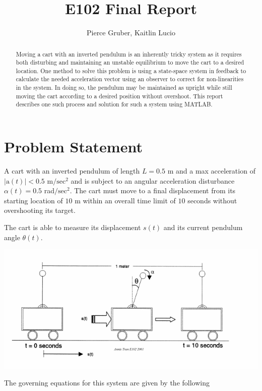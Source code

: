 \documentclass[10pt]{article}
\title{E102 Final Report}
\author{Pierce Gruber, Kaitlin Lucio}
\begin{document}
\maketitle

\begin{abstract}
Moving a cart with an inverted pendulum is an inherently tricky system as it requires both disturbing and maintaining an unstable equilibrium to move the cart to a desired location. One method to solve this problem is using a state-space system in feedback to calculate the needed acceleration vector using an observer to correct for non-linearities in the system. In doing so, the pendulum may be maintained as upright while still moving the cart according to a desired position without overshoot. This report describes one such process and solution for such a system using MATLAB.
\end{abstract}

\section{Problem Statement}
A cart with an inverted pendulum of length $L = 0.5\text{ m}$ and a max acceleration of $|\text{a}(t)| < 0.5 \text{ m}/\text{sec}^2$ and is subject to an angular acceleration disturbance $\alpha(t) = 0.5$ rad$/\text{sec}^{2}$. The cart must move to a final displacement from its starting location of $10$ m within an overall time limit of $10$ seconds without overshooting its target.

The cart is able to measure its displacement $s(t)$ and its current pendulum angle $\theta(t)$.

\begin{center}
    \includegraphics{graphs/invpen.png}
\end{center}

The governing equations for this system are given by the following
\end{document}
